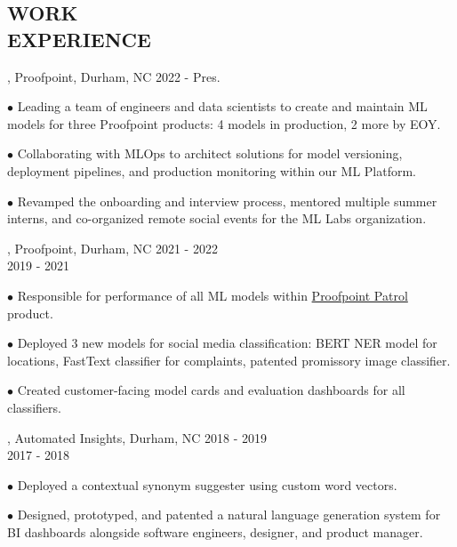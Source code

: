 \documentclass[resmargin, 11pt]{resume_style_class} %
\newenvironment{outline}
  {\begin{list}{}{\setlength{\leftmargin}{30pt}\setlength\itemsep{-2pt}}}
  {\end{list}}
\begin{document}
\begin{resume}

 
\section{WORK \\ EXPERIENCE}
, Proofpoint, Durham, NC \hfill 2022 - Pres.
\begin{outline}
	\item[$\bullet$\hspace{0.1cm}] Leading a team of engineers and data scientists to create and maintain ML models for three Proofpoint products: 4 models in production, 2 more by EOY.
	\item[$\bullet$\hspace{0.1cm}] Collaborating with MLOps to architect solutions for model versioning, deployment pipelines, and production monitoring within our ML Platform.
	\item[$\bullet$\hspace{0.1cm}] Revamped the onboarding and interview process, mentored multiple summer interns, and co-organized remote social events for the ML Labs organization.
\end{outline} 
, Proofpoint, Durham, NC \hfill 2021 - 2022 \\
 \hfill 2019 - 2021
\begin{outline}
	\item[$\bullet$\hspace{0.1cm}] Responsible for performance of all ML models within \href{https://www.proofpoint.com/us/products/archiving-and-compliance/patrol}{Proofpoint Patrol} product.
	\item[$\bullet$\hspace{0.1cm}] Deployed 3 new models for social media classification: BERT NER model for locations, FastText classifier for complaints, patented promissory image classifier.
	\item[$\bullet$\hspace{0.1cm}] Created customer-facing model cards and evaluation dashboards for all classifiers.
\end{outline} 

, Automated Insights, Durham, NC \hfill 2018 - 2019 \\
 \hfill 2017 - 2018
\begin{outline}
	\item[$\bullet$\hspace{0.1cm}] Deployed a contextual synonym suggester using custom word vectors.
	\item[$\bullet$\hspace{0.1cm}] Designed, prototyped, and patented a natural language generation system for BI dashboards alongside software engineers, designer, and product manager.
\end{outline} 


\end{resume}
\end{document}
